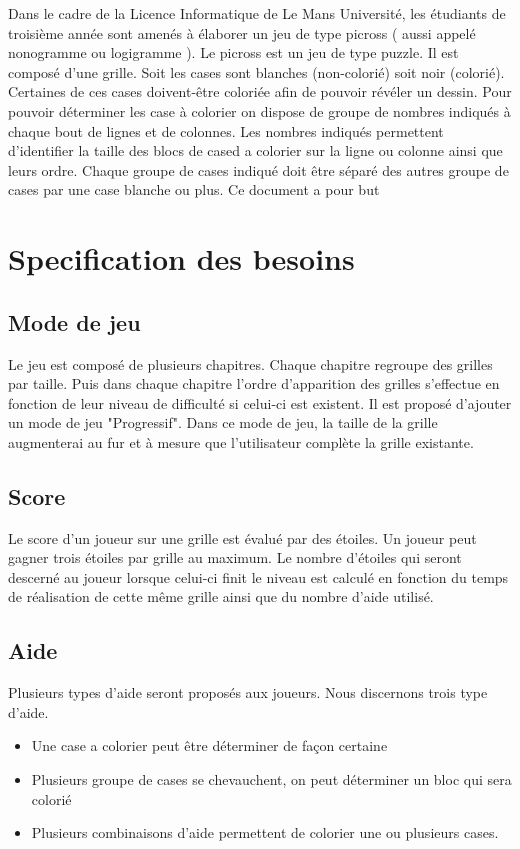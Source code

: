 \documentclass{report}
\begin{document}
		Dans le cadre de la Licence Informatique de Le Mans Université, les étudiants de troisième année sont amenés à élaborer un jeu de type picross ( aussi appelé nonogramme ou logigramme ).
	\newline
		Le picross est un jeu de type puzzle. Il est composé d'une grille. Soit les cases sont blanches (non-colorié) soit noir (colorié). 	
		Certaines de ces cases doivent-être coloriée afin de pouvoir révéler un dessin. Pour pouvoir déterminer les case à colorier on dispose de groupe de nombres indiqués à chaque bout de lignes et de colonnes.
		\newline
		Les nombres indiqués permettent d'identifier la taille des blocs de cased a colorier sur la ligne ou colonne ainsi que leurs ordre.
		\newline
		Chaque groupe de cases indiqué doit être séparé des autres groupe de cases par une case blanche ou plus.
		\newline
		Ce document a pour but



\chapter{Specification des besoins}

		\section{Mode de jeu}
			Le jeu est composé de plusieurs chapitres. Chaque chapitre regroupe des grilles par taille.
			\newline
			Puis dans chaque chapitre l'ordre d'apparition des grilles s'effectue en fonction de leur niveau de difficulté si celui-ci est existent.
			Il est proposé d'ajouter un mode de jeu "Progressif". Dans ce mode de jeu, la taille de la grille augmenterai au fur et à mesure que l'utilisateur complète la grille existante.

		
		\section{Score}
			Le score d'un joueur sur une grille est évalué par des étoiles. Un joueur peut gagner trois étoiles par grille au maximum. Le nombre d'étoiles qui seront descerné au joueur lorsque celui-ci finit le niveau est calculé en fonction du temps de réalisation de cette même grille ainsi que du nombre d'aide utilisé.
			
			
		\section{Aide}
			Plusieurs types d'aide seront proposés aux joueurs. Nous discernons trois type d'aide.
			\begin{itemize}
			    \item Une case a colorier peut être déterminer de façon certaine
			    \item Plusieurs groupe de cases se chevauchent, on peut déterminer un bloc qui sera colorié
			    \item Plusieurs combinaisons d'aide permettent de colorier une ou plusieurs cases.
			\end{itemize}
			
\end{document}
